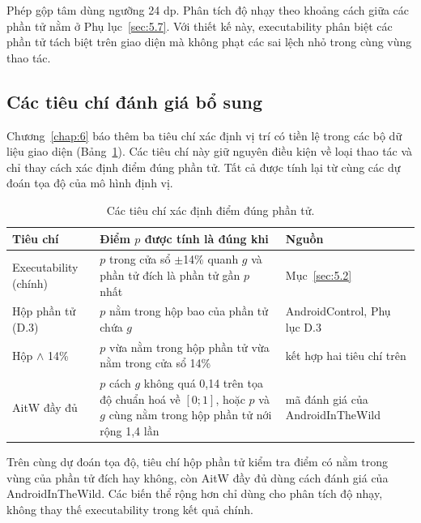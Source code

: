Phép gộp tâm dùng ngưỡng 24 dp. Phân tích độ nhạy theo khoảng cách giữa các phần tử nằm ở Phụ lục~\ref{sec:5.7}. Với thiết kế này, executability phân biệt các phần tử tách biệt trên giao diện mà không phạt các sai lệch nhỏ trong cùng vùng thao tác.

\subsection{Các tiêu chí đánh giá bổ sung}\label{sec:5.12}

Chương~\ref{chap:6} báo thêm ba tiêu chí xác định vị trí có tiền lệ trong các bộ dữ liệu giao diện (Bảng~\ref{tab:5.tieuchi}). Các tiêu chí này giữ nguyên điều kiện về loại thao tác và chỉ thay cách xác định điểm đúng phần tử. Tất cả được tính lại từ cùng các dự đoán tọa độ của mô hình định vị.

\begin{table}[htbp]
\centering\small
\caption{Các tiêu chí xác định điểm đúng phần tử.}\label{tab:5.tieuchi}
\setlength{\tabcolsep}{4pt}
\begin{tabularx}{\textwidth}{@{}>{\raggedright\arraybackslash\hsize=0.62\hsize}X>{\raggedright\arraybackslash\hsize=1.6\hsize}X>{\raggedright\arraybackslash\hsize=0.78\hsize}X@{}}
\toprule
\textbf{Tiêu chí} & \textbf{Điểm $p$ được tính là đúng khi} & \textbf{Nguồn} \\
\midrule
Executability (chính) & $p$ trong cửa sổ $\pm$14\% quanh $g$ và phần tử đích là phần tử gần $p$ nhất & Mục~\ref{sec:5.2} \\
Hộp phần tử (D.3) & $p$ nằm trong hộp bao của phần tử chứa $g$ & AndroidControl, Phụ lục D.3~\cite{androidcontrol} \\
Hộp $\wedge$ 14\% & $p$ vừa nằm trong hộp phần tử vừa nằm trong cửa sổ 14\% & kết hợp hai tiêu chí trên \\
AitW đầy đủ & $p$ cách $g$ không quá 0,14 trên tọa độ chuẩn hoá về $[0;1]$, hoặc $p$ và $g$ cùng nằm trong hộp phần tử nới rộng 1,4 lần & mã đánh giá của AndroidInTheWild~\cite{aitw} \\
\bottomrule
\end{tabularx}
\end{table}

Trên cùng dự đoán tọa độ, tiêu chí hộp phần tử kiểm tra điểm có nằm trong vùng của phần tử đích hay không, còn AitW đầy đủ dùng cách đánh giá của AndroidInTheWild. Các biến thể rộng hơn chỉ dùng cho phân tích độ nhạy, không thay thế executability trong kết quả chính.

